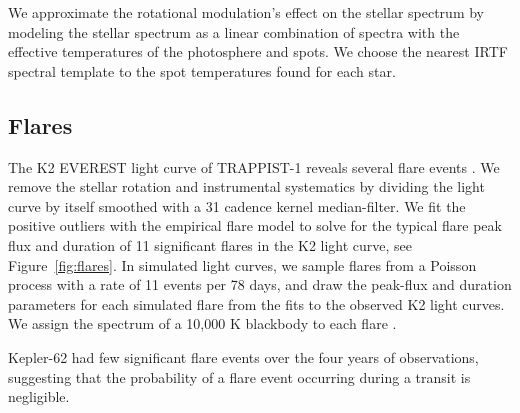 



We approximate the rotational modulation's effect on the stellar spectrum by modeling the stellar spectrum as a linear combination of spectra with the effective temperatures of the photosphere and spots. %
We choose the nearest IRTF spectral template to the spot temperatures found for each star. 


\subsection{Flares}

The K2 EVEREST light curve of TRAPPIST-1 reveals several flare events \citep{luger2017everest}. We remove the stellar rotation and instrumental systematics by dividing the light curve by itself smoothed with a 31 cadence kernel median-filter. We fit the positive outliers with the \citet{Davenport2014} empirical flare model to solve for the typical flare peak flux and duration of 11 significant flares in the K2 light curve, see Figure~\ref{fig:flares}. In simulated light curves, we sample flares from a Poisson process with a rate of 11 events per 78 days, and draw the peak-flux and duration parameters for each simulated flare from the fits to the observed K2 light curves. We assign the spectrum of a 10,000 K blackbody to each flare \citep{Kowalski2015}.

Kepler-62 had few significant flare events over the four years of \kepler observations, suggesting that the probability of a flare event occurring during a transit is negligible. 


